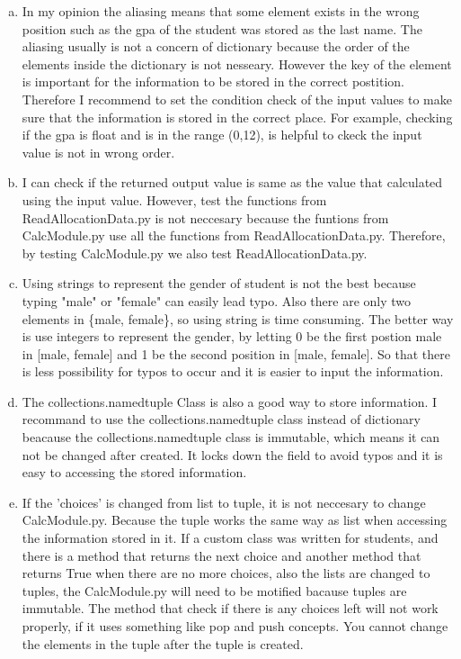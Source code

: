 \documentclass[12pt]{article}
\begin{document}
\begin{enumerate}[(a)]
\item In my opinion the aliasing means that some element exists in the wrong position such as the gpa of the student was stored as the last name. The aliasing usually is not a concern of dictionary because the order of the elements inside the dictionary is not nesseary. However the key of the element is important for the information to be stored in the correct postition. Therefore I recommend to set the condition check of the input values to make sure that the information is stored in the correct place. For example, checking if the gpa is float and is in the range (0,12), is helpful to ckeck the input value is not in wrong order. 

\item I can check if the returned output value is same as the value that calculated using the input value. However, test the functions from ReadAllocationData.py is not neccesary because the funtions from CalcModule.py use all the functions from ReadAllocationData.py. Therefore, by testing CalcModule.py we also test ReadAllocationData.py.

\item Using strings to represent the gender of student is not the best because typing "male" or "female" can easily lead typo. Also there are only two elements in \{male, female\}, so using string is time consuming. The better way is use integers to represent the gender, by letting 0 be the first postion male in [male, female] and 1 be the second position in [male, female]. So that there is less possibility for typos to occur and it is easier to input the information.

\item The collections.namedtuple Class is also a good way to store information. I recommand to use the collections.namedtuple class instead of dictionary beacause the collections.namedtuple class is immutable, which means it can not be changed after created. It locks down the field to avoid typos and it is easy to accessing the stored information.

\item If the 'choices' is changed from list to tuple, it is not neccesary to change CalcModule.py. Because the tuple works the same way as list when accessing the information stored in it. If a custom class was written for students, and there is a method that returns the next choice and another method that returns True when there are no more choices, also the lists are changed to tuples, the CalcModule.py will need to be motified bacause tuples are immutable. The method that check if there is any choices left will not work properly, if it uses something like pop and push concepts. You cannot change the elements in the tuple after the tuple is created.

\end{enumerate}
\end{document}
